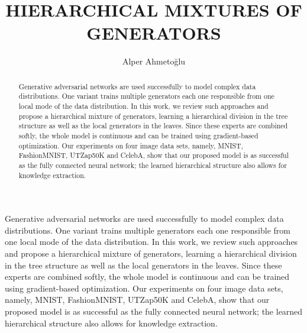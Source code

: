 \documentclass[a4paper,onesided,12pt]{report}
\title{HIERARCHICAL MIXTURES OF GENERATORS}
\author{Alper Ahmetoğlu}
\begin{document}
\makemstitle %
\makeapprovalpage
\begin{acknowledgements}
\lipsum[1]
\end{acknowledgements}
\begin{abstract}
Generative adversarial networks are used successfully to model complex data distributions. One variant trains multiple generators each one responsible from one local mode of the data distribution. In this work, we review such approaches and propose a hierarchical mixture of generators, learning a hierarchical division in the tree structure as well as the local generators in the leaves. Since these experts are combined softly, the whole model is continuous and can be trained using gradient-based optimization. Our experiments on four image data sets, namely, MNIST, FashionMNIST, UTZap50K and CelebA, show that our proposed model is as successful as the fully connected neural network; the learned hierarchical structure also allows for knowledge extraction.
\end{abstract}
\begin{ozet}
Generative adversarial networks are used successfully to model complex data distributions. One variant trains multiple generators each one responsible from one local mode of the data distribution. In this work, we review such approaches and propose a hierarchical mixture of generators, learning a hierarchical division in the tree structure as well as the local generators in the leaves. Since these experts are combined softly, the whole model is continuous and can be trained using gradient-based optimization. Our experiments on four image data sets, namely, MNIST, FashionMNIST, UTZap50K and CelebA, show that our proposed model is as successful as the fully connected neural network; the learned hierarchical structure also allows for knowledge extraction.
\end{ozet}
\tableofcontents
\listoffigures
\listoftables
\begin{symbols}
%

\sym{}{}

\end{symbols}
\end{document}

